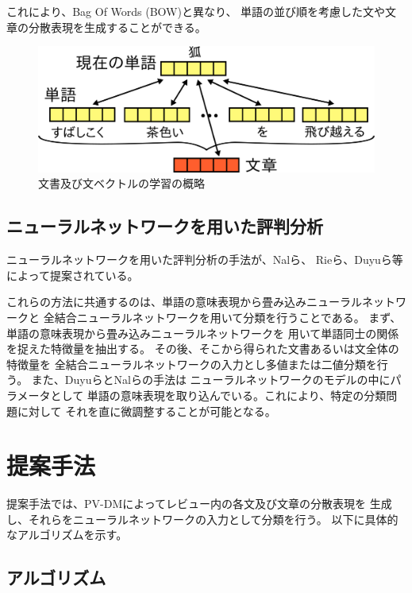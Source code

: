 \documentclass[twocolumn,a4paper]{ltjarticle}
\makeatletter
\let\tti@includegraphics\includegraphics
\renewcommand{\includegraphics}[1]{%
    \tti@includegraphics[width=\linewidth]{#1}}
\makeatother
\begin{document}
これにより、Bag Of Words (BOW)と異なり、
単語の並び順を考慮した文や文章の分散表現を生成することができる。

\begin{figure}
  \includegraphics{fig/paragraph_vector.png}
  \caption{文書及び文ベクトルの学習の概略}
  \label{fig:ParagraphVector}
\end{figure}


\subsection{ニューラルネットワークを用いた評判分析}

ニューラルネットワークを用いた評判分析の手法が、Nalら\cite{nal14}、
Rieら\cite{rie14}、Duyuら\cite{duyu15}等によって提案されている。

これらの方法に共通するのは、単語の意味表現から畳み込みニューラルネットワークと
全結合ニューラルネットワークを用いて分類を行うことである。
まず、単語の意味表現から畳み込みニューラルネットワークを
用いて単語同士の関係を捉えた特徴量を抽出する。
その後、そこから得られた文書あるいは文全体の特徴量を
全結合ニューラルネットワークの入力とし多値または二値分類を行う。
また、Duyuら\cite{duyu15}とNalら\cite{nal14}の手法は
ニューラルネットワークのモデルの中にパラメータとして
単語の意味表現を取り込んでいる。これにより、特定の分類問題に対して
それを直に微調整することが可能となる。



\section{提案手法}

提案手法では、PV-DMによってレビュー内の各文及び文章の分散表現を
生成し、それらをニューラルネットワークの入力として分類を行う。
以下に具体的なアルゴリズムを示す。


\subsection{アルゴリズム}
\end{document}
